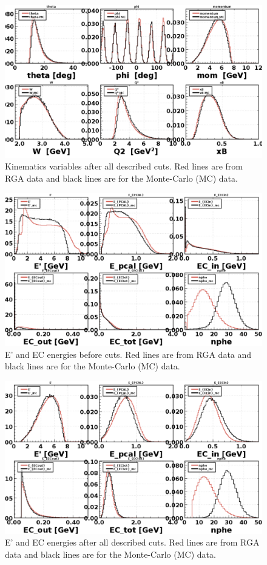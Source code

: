\begin{figure}[h!]
	\centering
	\includegraphics[width=0.9\linewidth]{figures/rga/kinematics.png}
	\caption{Kinematics variables after all described cuts. Red lines are from RGA data and black lines are for the Monte-Carlo (MC) data.}
	\label{fig:rga_kinematics_cut}
\end{figure}

\newpage
\begin{figure}[h!]
	\centering
	\includegraphics[width=0.9\linewidth]{figures/rga/uncut/energies.png}
	\caption{E' and EC energies before cuts. Red lines are from RGA data and black lines are for the Monte-Carlo (MC) data.}
	\label{fig:rga_energies_uncut}
\end{figure}

\begin{figure}[h!]
	\centering
	\includegraphics[width=0.9\linewidth]{figures/rga/energies.png}
	\caption{E' and EC energies after all described cuts. Red lines are from RGA data and black lines are for the Monte-Carlo (MC) data.}
	\label{fig:rga_energies}
\end{figure}

